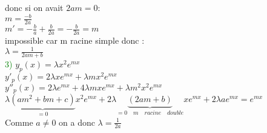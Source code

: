 \documentclass{article}
\begin{document}
	donc si on avait $2am=0$: \\ 
	 $m=\frac{-b}{2a}$ \\ 
	 $m'=-\frac{b}{a}+\frac{b}{2a}=-\frac{b}{2a}=m$ \\ 
	 impossible car m racine simple donc : \\ 
	 $\lambda = \frac{1}{2am+b}$ \\ 
	 \textcolor{green}{3)} $y_p(x)=\lambda x^2 e^{mx}$ \\ 
	 $y'_p(x)=2\lambda x e^{mx}+ \lambda m x^2 e^{mx}$ \\ 
	 $y''_p(x)=2 \lambda e^{mx}+4 \lambda m x e^{mx}+\lambda m^2 x^2 e^{mx}$ \\ 
	 $\lambda\underbrace{(am^2+bm+c)}_{=0}x^2e^{mx}+2 \lambda \underbrace{(2am+b)}_{=0 \quad m \quad racine \quad double}x e^{mx}+2\lambda a e^{mx}=e^{mx}$ \\
	 Comme $a \neq 0$ on a donc $\lambda=\frac{1}{2a}$
	
\end{document}
